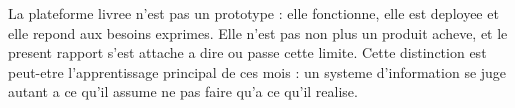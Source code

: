 La plateforme livree n'est pas un prototype : elle fonctionne, elle est
deployee et elle repond aux besoins exprimes. Elle n'est pas non plus un
produit acheve, et le present rapport s'est attache a dire ou passe cette
limite. Cette distinction est peut-etre l'apprentissage principal de ces
\stageDuree{} mois : un systeme d'information se juge autant a ce qu'il
assume ne pas faire qu'a ce qu'il realise.
